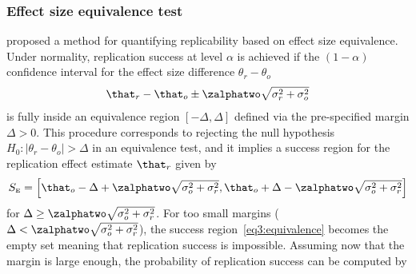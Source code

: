 \subsubsection{Effect size equivalence test}
\citet{Anderson2016} proposed a method for quantifying replicability based on
effect size equivalence. Under normality, replication success at level $\alpha$
is achieved if the $(1 - \alpha)$ confidence interval for the effect size
difference $\theta_{r} - \theta_{o}$
\begin{align*}
  \that_{r} - \that_{o} \pm \zalphatwo \sqrt{\sigma^{2}_{r} + \sigma^{2}_{o}}
\end{align*}
is fully inside an equivalence region $[-\Delta, \Delta]$ defined via the
pre-specified margin $\Delta > 0$. This procedure corresponds to rejecting the
null hypothesis $H_{0} \colon |\theta_{r} - \theta_{o}| > \Delta$ in an
equivalence test, and it implies a success region for the replication effect
estimate $\that_{r}$ given by
\begin{align}
  \label{eq3:equivalence}
  S_{\scriptscriptstyle \text{E}}
  = \left[\that_{o} - \Delta + \zalphatwo \sqrt{\sigma^{2}_{o} +
  \sigma^{2}_{r}}, \that_{o} + \Delta - \zalphatwo
  \sqrt{\sigma^{2}_{o} + \sigma^{2}_{r}}\right]
\end{align}
for $\Delta \geq \zalphatwo \sqrt{\sigma_{o}^{2} + \sigma^{2}_{r}}$. For too
small margins ($\Delta < \zalphatwo \sqrt{\sigma_{o}^{2} + \sigma^{2}_{r}}$),
the success region~\eqref{eq3:equivalence} becomes the empty set meaning that
replication success is impossible.
Assuming now that the margin is large enough,
the probability
of replication success can be computed by
